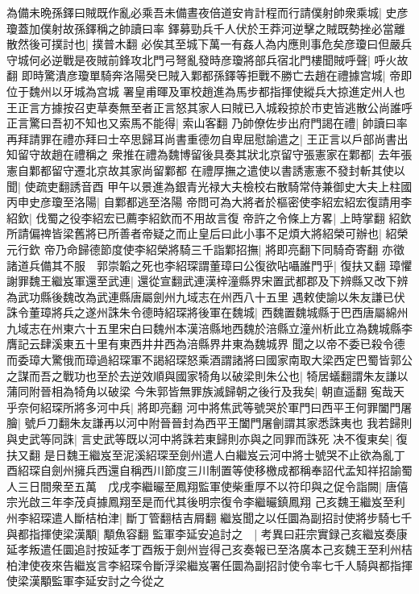 為備未晩孫鐸曰賊既作亂必乘吾未備晝夜倍道安肯計程而行請僕射帥衆乘城|{
	史彦瓊蓋加僕射故孫鐸稱之帥讀曰率}
鐸募勁兵千人伏於王莽河逆擊之賊既勢挫必當離散然後可撲討也|{
	撲普木翻}
必俟其至城下萬一有姦人為内應則事危矣彦瓊曰但嚴兵守城何必逆戰是夜賊前鋒攻北門弓弩亂發時彦瓊將部兵宿北門樓聞賊呼聲|{
	呼火故翻}
即時驚潰彦瓊單騎奔洛陽癸巳賊入鄴都孫鐸等拒戰不勝亡去趙在禮據宫城|{
	帝即位于魏州以牙城為宫城}
署皇甫暉及軍校趙進為馬步都指揮使縱兵大掠進定州人也王正言方據按召吏草奏無至者正言怒其家人曰賊已入城殺掠於市吏皆逃散公尚誰呼正言驚曰吾初不知也又索馬不能得|{
	索山客翻}
乃帥僚佐步出府門謁在禮|{
	帥讀曰率}
再拜請罪在禮亦拜曰士卒思歸耳尚書重德勿自卑屈慰諭遣之|{
	王正言以戶部尚書出知留守故趙在禮稱之}
衆推在禮為魏博留後具奏其狀北京留守張憲家在鄴都|{
	去年張憲自鄴都留守遷北京故其家尚留鄴都}
在禮厚撫之遣使以書誘憲憲不發封斬其使以聞|{
	使疏吏翻誘音酉}
甲午以景進為銀青光禄大夫檢校右散騎常侍兼御史大夫上柱國　丙申史彦瓊至洛陽|{
	自鄴都逃至洛陽}
帝問可為大將者於樞密使李紹宏紹宏復請用李紹欽|{
	伐蜀之役李紹宏已薦李紹欽而不用故言復}
帝許之令條上方畧|{
	上時掌翻}
紹欽所請偏禆皆梁舊將已所善者帝疑之而止皇后曰此小事不足煩大將紹榮可辦也|{
	紹榮元行欽}
帝乃命歸德節度使李紹榮將騎三千詣鄴招撫|{
	將即亮翻下同騎奇寄翻}
亦徵諸道兵備其不服　郭崇韜之死也李紹琛謂董璋曰公復欲呫囁誰門乎|{
	復扶又翻}
璋懼謝罪魏王繼岌軍還至武連|{
	還從宣翻武連漢梓潼縣界宋置武都郡及下辨縣又改下辨為武功縣後魏改為武連縣唐屬劍州九域志在州西八十五里}
遇敕使諭以朱友謙已伏誅令董璋將兵之遂州誅朱令德時紹琛將後軍在魏城|{
	西魏置魏城縣于巴西唐屬綿州九域志在州東六十五里宋白曰魏州本漢涪縣地西魏於涪縣立潼州析此立為魏城縣李膺記云肆溪東五十里有東西井井西為涪縣界井東為魏城界}
聞之以帝不委已殺令德而委璋大驚俄而璋過紹琛軍不謁紹琛怒乘酒謂諸將曰國家南取大梁西定巴蜀皆郭公之謀而吾之戰功也至於去逆效順與國家犄角以破梁則朱公也|{
	犄居蟻翻謂朱友謙以蒲同附晉相為犄角以破梁}
今朱郭皆無罪族滅歸朝之後行及我矣|{
	朝直遥翻}
寃哉天乎奈何紹琛所將多河中兵|{
	將即亮翻}
河中將焦武等號哭於軍門曰西平王何罪闔門屠膾|{
	號戶刀翻朱友謙再以河中附晉晉封為西平王闔門屠劊謂其家悉誅夷也}
我若歸則與史武等同誅|{
	言史武等既以河中將誅若東歸則亦與之同罪而誅死}
决不復東矣|{
	復扶又翻}
是日魏王繼岌至泥溪紹琛至劍州遣人白繼岌云河中將士號哭不止欲為亂丁酉紹琛自劍州擁兵西還自稱西川節度三川制置等使移檄成都稱奉詔代孟知祥招諭蜀人三日間衆至五萬　戊戌李繼曮至鳳翔監軍使柴重厚不以符印與之促令詣闕|{
	唐僖宗光啟三年李茂貞據鳳翔至是而代其後明宗復令李繼曮鎮鳳翔}
己亥魏王繼岌至利州李紹琛遣人斷桔柏津|{
	斷丁管翻桔吉屑翻}
繼岌聞之以任圜為副招討使將步騎七千與都指揮使梁漢顒|{
	顒魚容翻}
監軍李延安追討之　|{
	考異曰莊宗實録己亥繼岌奏康延孝叛遣任圜追討按延孝丁酉叛于劍州豈得己亥奏報已至洛廣本己亥魏王至利州桔柏津使夜來告繼岌言李紹琛令斷浮梁繼岌署任圜為副招討使令率七千人騎與都指揮使梁漢顒監軍李延安討之今從之}

